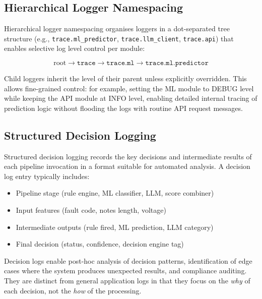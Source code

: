 \documentclass[10pt,a4paper]{article}
\begin{document}
\subsection{Hierarchical Logger Namespacing}
\label{sec:logger-namespacing}

Hierarchical logger namespacing organises loggers in a dot-separated tree structure (e.g., \texttt{trace.ml\_predictor}, \texttt{trace.llm\_client}, \texttt{trace.api}) that enables selective log level control per module:

\begin{equation}
\text{root} \to \texttt{trace} \to \texttt{trace.ml} \to \texttt{trace.ml.predictor}
\label{eq:logger-hierarchy}
\end{equation}

Child loggers inherit the level of their parent unless explicitly overridden. This allows fine-grained control: for example, setting the ML module to DEBUG level while keeping the API module at INFO level, enabling detailed internal tracing of prediction logic without flooding the logs with routine API request messages.

\subsection{Structured Decision Logging}
\label{sec:decision-logging}

Structured decision logging records the key decisions and intermediate results of each pipeline invocation in a format suitable for automated analysis. A decision log entry typically includes:

\begin{itemize}
    \item Pipeline stage (rule engine, ML classifier, LLM, score combiner)
    \item Input features (fault code, notes length, voltage)
    \item Intermediate outputs (rule fired, ML prediction, LLM category)
    \item Final decision (status, confidence, decision engine tag)
\end{itemize}

Decision logs enable post-hoc analysis of decision patterns, identification of edge cases where the system produces unexpected results, and compliance auditing. They are distinct from general application logs in that they focus on the \emph{why} of each decision, not the \emph{how} of the processing.
\end{document}
